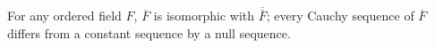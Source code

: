 For any ordered field $F$, $\overline{F}$ is isomorphic with $\overline{\overline{F}}$; every Cauchy sequence of $\overline{F}$ differs from a constant sequence by a null sequence.